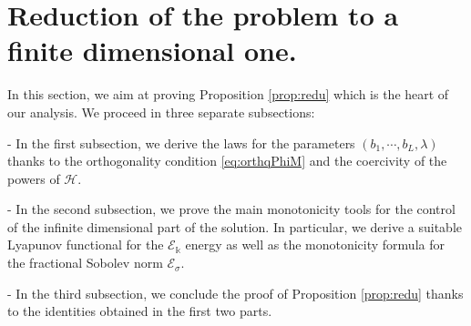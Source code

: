 \documentclass[11pt]{aims}
\theoremstyle{definition}
\numberwithin{equation}{section}
\begin{document}
\section{Reduction of the problem to a finite dimensional one.} \label{sec:4}

In this section, we aim at proving Proposition \ref{prop:redu} which is the heart of our analysis. We proceed in three separate subsections:

- In the first subsection, we derive the laws for the parameters $(b_1, \cdots, b_L,\lambda)$ thanks to the orthogonality condition \eqref{eq:orthqPhiM} and the coercivity of the powers of ${\mathscr{H}}$.

- In the second subsection, we prove the main monotonicity tools for the control of the infinite dimensional part of the solution. In particular, we derive a suitable Lyapunov functional for the ${\mathscr{E}}_{\Bbbk}$ energy as well as the monotonicity formula for the fractional Sobolev norm ${\mathscr{E}}_\sigma$.

- In the third subsection, we conclude the proof of Proposition \ref{prop:redu} thanks to the identities obtained in the first two parts.
\end{document}
